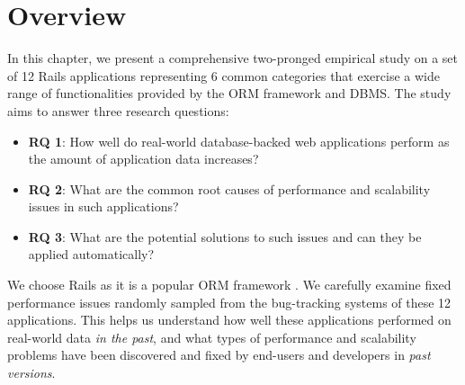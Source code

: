 \section{Overview}
\label{sec:overview}
In this chapter, we present a comprehensive two-pronged empirical study on a set of 12 Rails applications representing 6 common categories that exercise a wide range of functionalities provided by the ORM framework and DBMS. The study aims to answer three research questions:

\begin{itemize}
\item {\bf RQ 1}: How well do real-world database-backed web applications perform as the amount of application data increases?
\item {\bf RQ 2}: What are the common root causes of performance and scalability issues in such applications?
\item {\bf RQ 3}: What are the potential solutions to such issues and can they be applied automatically?
\end{itemize}

We choose Rails as it is a popular ORM framework \cite{hotframework}.
%
%
%
%
We carefully examine \numissues fixed performance issues randomly sampled from the bug-tracking systems of these 12 applications. This helps us understand how well these applications performed on real-world data \textit{in the past}, and what types of performance and scalability problems have been discovered and fixed by end-users and developers in \textit{past versions}.

